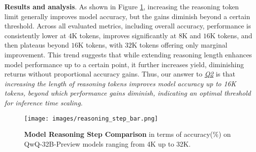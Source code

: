 \textbf{Results and analysis}. 
As shown in Figure \ref{fig:reasoning_step_comparison}, increasing the reasoning token limit generally improves model accuracy, but the gains diminish beyond a certain threshold. Across all evaluated metrics, including overall accuracy, performance is consistently lower at $4$K tokens, improves significantly at $8$K and $16$K tokens, and then plateaus beyond $16$K tokens, with $32$K tokens offering only marginal improvement. This trend suggests that while extending reasoning length enhances model performance up to a certain point, it further increases yield, diminishing returns without proportional accuracy gains. %
Thus, our answer to \textit{\underline{Q2}} is that \textit{increasing the length of reasoning tokens improves model accuracy up to 16K tokens, beyond which performance gains diminish, indicating an optimal threshold for inference time scaling.}




\begin{figure}
    \centering
    \texttt{[image: images/reasoning\_step\_bar.png]}
    \caption{\textbf{Model Reasoning Step Comparison} in terms of accuracy(\%) on QwQ-32B-Preview models ranging from 4K up to 32K.}%
    \label{fig:reasoning_step_comparison}
    \vspace{-1.0em}
\end{figure}




